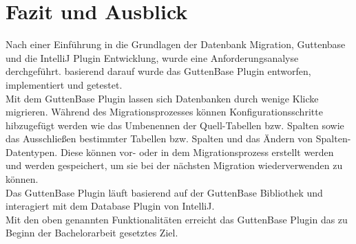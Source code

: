 \chapter{Fazit und Ausblick}


Nach einer Einführung in die Grundlagen der Datenbank Migration, Guttenbase und die IntelliJ Plugin Entwicklung, wurde eine Anforderungsanalyse derchgeführt. basierend darauf wurde das GuttenBase Plugin entworfen, implementiert und getestet. \\
Mit dem GuttenBase Plugin lassen sich Datenbanken durch wenige Klicke migrieren. Während des Migrationsprozesses können Konfigurationsschritte hibzugefügt werden wie das Umbenennen der Quell-Tabellen bzw. Spalten sowie das Ausschließen bestimmter Tabellen bzw. Spalten und das Ändern von Spalten-Datentypen. Diese können vor- oder in dem  Migrationsprozess erstellt werden und werden gespeichert, um sie bei der nächsten Migration wiederverwenden zu können.\\
Das GuttenBase Plugin läuft basierend auf der GuttenBase Bibliothek und interagiert mit dem Database Plugin von IntelliJ.\\
Mit den oben genannten Funktionalitäten erreicht das GuttenBase Plugin das zu Beginn der Bachelorarbeit gesetztes Ziel.